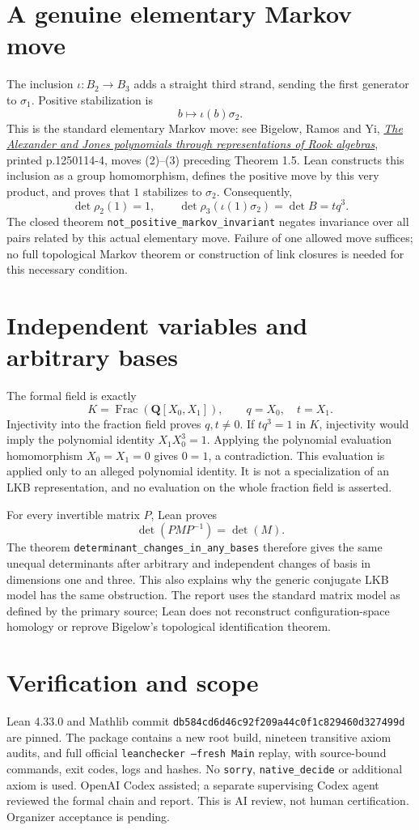 \documentclass[11pt]{article}
\begin{document}
\newpage
\section{A genuine elementary Markov move}
The inclusion $\iota:B_2\to B_3$ adds a straight third strand, sending
the first generator to $\sigma_1$. Positive stabilization is
\[
 b\longmapsto\iota(b)\sigma_2.
\]
This is the standard elementary Markov move: see Bigelow, Ramos and Yi,
\href{https://web.math.ucsb.edu/~bigelow/publications/15.pdf}
{\emph{The Alexander and Jones polynomials through representations of
Rook algebras}}, printed p.1250114-4, moves (2)--(3) preceding Theorem 1.5.
Lean constructs this inclusion as a group homomorphism, defines the
positive move by this very product, and proves that $1$ stabilizes to
$\sigma_2$. Consequently,
\[
 \det\rho_2(1)=1,\qquad
 \det\rho_3(\iota(1)\sigma_2)=\det B=tq^3.
\]
The closed theorem \texttt{not\_positive\_markov\_invariant} negates
invariance over all pairs related by this actual elementary move.
Failure of one allowed move suffices; no full topological Markov theorem
or construction of link closures is needed for this necessary condition.

\section{Independent variables and arbitrary bases}
The formal field is exactly
\[
 K=\operatorname{Frac}(\mathbf Q[X_0,X_1]),\qquad q=X_0,\quad t=X_1.
\]
Injectivity into the fraction field proves $q,t\ne0$. If $tq^3=1$
in $K$, injectivity would imply the polynomial identity
$X_1X_0^3=1$. Applying the polynomial evaluation homomorphism
$X_0=X_1=0$ gives $0=1$, a contradiction. This evaluation is applied
only to an alleged polynomial identity. It is not a specialization of
an LKB representation, and no evaluation on the whole fraction field
is asserted.

For every invertible matrix $P$, Lean proves
\[
 \det(PMP^{-1})=\det(M).
\]
The theorem \texttt{determinant\_changes\_in\_any\_bases} therefore
gives the same unequal determinants after arbitrary and independent
changes of basis in dimensions one and three. This also explains why
the generic conjugate LKB model has the same obstruction. The report
uses the standard matrix model as defined by the primary source;
Lean does not reconstruct configuration-space homology or reprove
Bigelow's topological identification theorem.

\section{Verification and scope}
Lean 4.33.0 and Mathlib commit
\texttt{db584cd6d46c92f209a44c0f1c829460d327499d} are pinned.
The package contains a new root build, nineteen transitive axiom audits,
and full official \texttt{leanchecker --fresh Main} replay, with
source-bound commands, exit codes, logs and hashes.
No \texttt{sorry}, \texttt{native\_decide} or additional axiom is used.
OpenAI Codex assisted; a separate supervising Codex agent reviewed the
formal chain and report. This is AI review, not human certification.
Organizer acceptance is pending.
\end{document}
